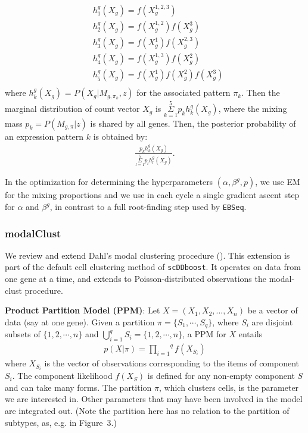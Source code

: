 \documentclass[aoas,preprint]{imsart}
\begin{document}
\begin{align*}
&h_1^{g}(X_g) = f(X_g^{1,2,3})\\
&h_2^{g}(X_g) = f(X_g^{1,2})f(X_g^3)\\
&h_3^{g}(X_g) = f(X_g^1)f(X_g^{2,3})\\
&h_4^{g}(X_g) = f(X_g^{1,3})f(X_g^2)\\
&h_5^{g}(X_g) = f(X_g^1)f(X_g^2)f(X_g^3)\\
\end{align*}
where $h_k^{g}(X_g)$ = $P(X_g | M_{g,\pi_k},z)$ for the  associated pattern $\pi_k$.
Then the marginal distribution of count vector $X_g$ is 
$\overset{5}{\underset{k = 1}{\Sigma}} p_k h_k^{g}(X_g)$, 
where the mixing mass $p_k = P(M_{g,\pi} | z)$ is shared by all genes. 
Then, the posterior probability of an expression pattern $k$ is obtained by:
\begin{eqnarray*}
\frac{p_k h^g_k(X_g)}{\overset{5}{\underset{l = 1}{\Sigma}} p_l h_l^{g}(X_g)}.
\end{eqnarray*}


In the optimization for determining the hyperparameters 
$(\alpha, \beta^g, p)$, we use EM for the mixing proportions and
we use in each cycle a single gradient ascent step for $\alpha$ and $\beta^g$, in 
contrast to a full root-finding step used by \verb+EBSeq+. 



\subsubsection*{modalClust}

We review and extend Dahl's modal clustering procedure  (\cite{ref:dahl}).
This extension is part of the default cell clustering method of \verb+scDDboost+.
It operates on data from one gene at a time, and extends to Poisson-distributed observations
the modal-clust procedure.

\noindent
{\bf Product Partition Model (PPM)}:
Let $X = (X_1, X_2, ...,X_n)$ be a vector of data (say at one gene). 
Given a partition $\pi = \{S_1, \cdots, S_q\}$, where $S_i$ are disjoint subsets 
of $\{1,2,\cdots,n\}$ and $\bigcup_{i = 1}^{q} S_i = \{1,2,\cdots,n\}$, a PPM 
for $X$ entails
\begin{eqnarray*}
p(X|\pi) = \overset{q}{\underset{i = 1}{\prod}}f(X_{S_i})
\end{eqnarray*}
where $X_{S_i}$ is the vector of observations corresponding to the items of component $S_i$. The component likelihood $f(X_{S})$ is defined for any non-empty component $S$ and can take many forms. 
The partition $\pi$, which clusters cells,  is the parameter we are interested in.
Other parameters that may have been involved in the model are integrated out.
(Note the partition here has no relation to the partition of subtypes, as, e.g. in Figure~3.)
\end{document}
